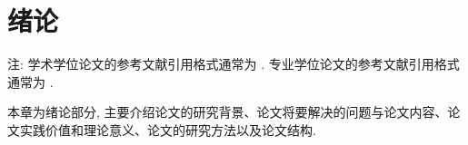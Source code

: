\documentclass[acaddeg]{Style/SCNUThesisV3}
\begin{document}
\let\cleardoublepage \clearpage



\passthedefense



\tableofcontents

\newpage{}\setcounter{page}{1}

\pagestyle{fancy}
\fancyhf{}
\renewcommand{\headrulewidth}{0.8pt}  %
\fancyhead[CO]{\wuhao \titleinheader}  %
\cfoot{\thepage}

\mainmatter
\chapter{绪论}\label{Cha: 1} %


注: 学术学位论文的参考文献引用格式通常为 \cite{xu}.  专业学位论文的参考文献引用格式通常为 .

本章为绪论部分, 主要介绍论文的研究背景、论文将要解决的问题与论文内容、论文实践价值和理论意义、论文的研究方法以及论文结构. 
\end{document}
